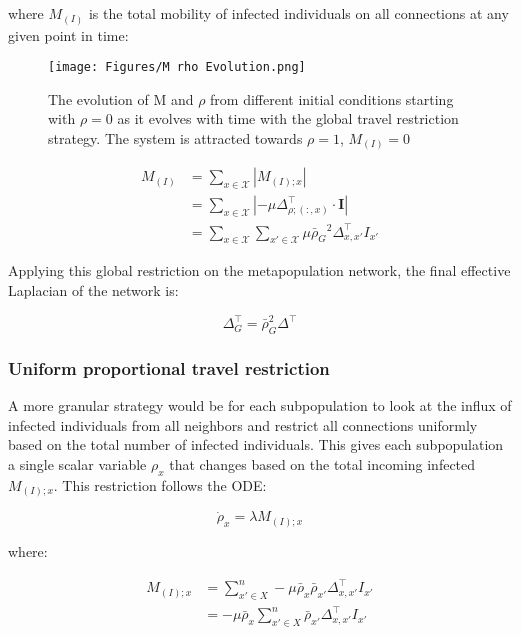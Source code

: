 where $M_{(I)}$ is the total mobility of infected individuals on all connections at any given point in time:
\begin{figure}
    \centering
    \texttt{[image: Figures/M rho Evolution.png]}
    \caption{\small The evolution of M and $\rho$ from different initial conditions starting with $\rho=0$ as it evolves with time with the global travel restriction strategy. The system is attracted towards $\rho=1$, $M_{(I)}=0$}
    \label{fig: M rho unbiased}
\end{figure}
\begin{equation}
    \begin{aligned}
        M_{(I)} &= \sum_{x \in \mathcal{X}}  \left| M_{(I);x}\right|\\
                &= \sum_{x \in \mathcal{X}} \left|- \mu \Delta_{\rho;(:,x)}^{\top} \cdot \mathbf{I}\right|\\
                &= \sum_{x \in \mathcal{X}} \sum_{x' \in \mathcal{X}} \mu {\bar{\rho}_{G}}^2 \Delta^{\top}_{x,x'} I_{x'}
    \end{aligned}
\end{equation}

Applying this global restriction on the metapopulation network, the final effective Laplacian of the network is:

\begin{equation}
\Delta_G^{\top} = \bar{\rho}_G^2 \Delta^{\top}
\end{equation}

\subsubsection{Uniform proportional travel restriction}

A more granular strategy would be for each subpopulation to look at the influx of infected individuals from all neighbors and restrict all connections uniformly based on the total number of infected individuals. This gives each subpopulation a single scalar variable $\rho_x$ that changes based on the total incoming infected $M_{(I);x}$. This restriction follows the ODE:

\begin{equation}
\dot{\rho}_x = \lambda M_{(I);x}
\end{equation}

where:

\begin{equation}
    \begin{aligned}
        M_{(I);x}   &= \sum_{x' \in X}^{n} -\mu \bar{\rho}_x \bar{\rho}_{x'} \Delta^{\top}_{x,x'} I_{x'}\\
                    &= -\mu \bar{\rho}_x \sum_{x' \in X}^{n} \bar{\rho}_{x'} \Delta^{\top}_{x,x'} I_{x'} 
    \end{aligned}
\end{equation}

